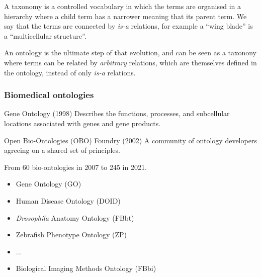 \begin{frame}[fragile]
{  A taxonomy is a controlled vocabulary in which the terms are organised
  in a hierarchy where a child term has a narrower meaning that its
  parent term. We say that the terms are connected by \emph{is-a}
  relations, for example a ``wing blade'' is a ``multicellular
  structure''.

  An ontology is the ultimate step of that evolution, and can be seen as
  a taxonony where terms can be related by \emph{arbitrary} relations,
  which are themselves defined in the ontology, instead of only
  \emph{is-a} relations.}
\end{frame}

\begin{frame}
  \frametitle{Biomedical ontologies}

  \begin{block}{Gene Ontology (1998)}
    Describes the functions, processes, and subcellular locations
    associated with genes and gene products.
  \end{block}

  \begin{block}{Open Bio-Ontologies (OBO) Foundry (2002)}
    A community of ontology developers agreeing on a shared set of
    principles.

    \bigskip
    From 60 bio-ontologies in 2007 to 245 in 2021.
    \begin{itemize}
      \item Gene Ontology (GO)
      \item Human Disease Ontology (DOID)
      \item \emph{Drosophila} Anatomy Ontology (FBbt)
      \item Zebrafish Phenotype Ontology (ZP)
      \item ...
      \item Biological Imaging Methods Ontology (FBbi)
    \end{itemize}
  \end{block}

\end{frame}
